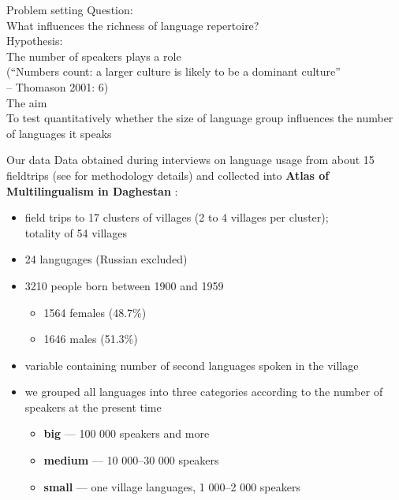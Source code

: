 \documentclass[13pt, t]{beamer}
\begin{document}
\begin{frame}{Problem setting}
\alert{Question:\\}
What influences the richness of language repertoire?\\
\vfill
\alert{Hypothesis:\\}
The number of speakers plays a role\\
(``Numbers count: a larger culture is likely to be a dominant
culture''\\
– Thomason 2001: 6)\\
\vfill
\alert{The aim\\}
To test quantitatively whether the size of language group influences the number of languages it speaks
\end{frame}

\begin{frame}{Our data}
Data obtained during interviews on language usage from about 15 fieldtrips (see \citep{dobrushina2013} for methodology details) and  collected into \textbf{Atlas of Multilingualism in Daghestan} \citep{multidagestan17}:
\begin{itemize}
\item field trips to 17 clusters of villages (2 to 4 villages per cluster); \\ totality of 54 villages
\item 24 langugages (Russian excluded) \pause
\item 3210 people born between 1900 and 1959
\begin{itemize}
\item 1564  females (48.7\%)
\item 1646 males (51.3\%)
\end{itemize}
\item variable containing number of second languages spoken in the village\pause
\item we grouped all languages into three categories according to the number of speakers at the present time
\begin{itemize}
\item {\Large \color{colorbig} \textbf{big}} --- 100 000 speakers and more
\item {\Large \color{colormedium} \textbf{medium}} --- 10 000--30 000 speakers
\item {\Large \color{colorsmall} \textbf{small}} --- one village languages, 1 000--2 000 speakers
\end{itemize}
\end{itemize}
\end{frame}
\end{document}
